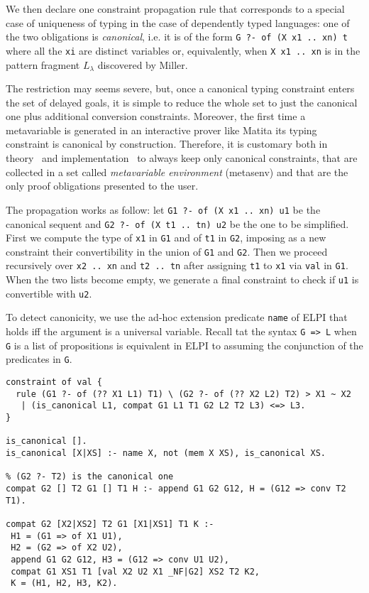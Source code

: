 \documentclass{easychair}
\begin{document}
We then declare one constraint propagation rule that corresponds to a special case of uniqueness of typing in the case of dependently typed languages: one of the two obligations is \emph{canonical}, i.e. it is of the form \verb+G ?- of (X x1 .. xn) t+ where all the \verb+xi+ are distinct variables or, equivalently, when \verb+X x1 .. xn+ is in the pattern fragment $L_\lambda$ discovered by Miller.

The restriction may seems severe, but, once a canonical typing constraint enters the set of delayed goals, it is simple to reduce the whole set to just the canonical one plus additional conversion constraints. Moreover, the first time a metavariable is generated in an interactive prover like Matita its typing constraint is canonical by construction. Therefore, it is customary both in theory~\cite{jojgov} and implementation~\cite{bidir} to always keep only canonical constraints, that are collected in a set called \emph{metavariable environment} (metasenv) and that are the only proof obligations presented to the user.

The propagation works as follow: let \verb+G1 ?- of (X x1 .. xn) u1+ be the canonical sequent and \verb+G2 ?- of (X t1 .. tn) u2+ be the one to be simplified. First we compute the type of \verb+x1+ in \verb+G1+ and of \verb+t1+ in \verb+G2+, imposing as a new constraint their convertibility in the union of \verb+G1+ and \verb+G2+. Then we proceed recursively over \verb+x2 .. xn+ and \verb+t2 .. tn+ after assigning \verb+t1+ to \verb+x1+ via \verb+val+ in \verb+G1+. When the two lists become empty, we generate a final constraint to check if \verb+u1+ is convertible with \verb+u2+.

To detect canonicity, we use the ad-hoc extension predicate \verb+name+ of ELPI that holds iff the argument is a universal variable. Recall tat the syntax \verb+G => L+ when \verb+G+ is a list of propositions is equivalent in ELPI to assuming the conjunction of the predicates in \verb+G+.

\begin{Verbatim}
constraint of val {
  rule (G1 ?- of (?? X1 L1) T1) \ (G2 ?- of (?? X2 L2) T2) > X1 ~ X2
   | (is_canonical L1, compat G1 L1 T1 G2 L2 T2 L3) <=> L3.
}

is_canonical [].
is_canonical [X|XS] :- name X, not (mem X XS), is_canonical XS.

% (G2 ?- T2) is the canonical one
compat G2 [] T2 G1 [] T1 H :- append G1 G2 G12, H = (G12 => conv T2 T1).

compat G2 [X2|XS2] T2 G1 [X1|XS1] T1 K :-
 H1 = (G1 => of X1 U1),
 H2 = (G2 => of X2 U2),
 append G1 G2 G12, H3 = (G12 => conv U1 U2),
 compat G1 XS1 T1 [val X2 U2 X1 _NF|G2] XS2 T2 K2,
 K = (H1, H2, H3, K2).
\end{Verbatim}
\end{document}
